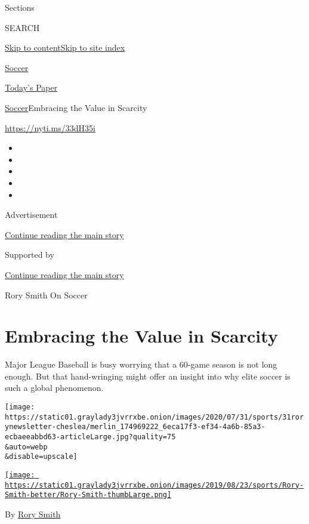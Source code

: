 Sections

SEARCH

\protect\hyperlink{site-content}{Skip to
content}\protect\hyperlink{site-index}{Skip to site index}

\href{https://www.nytimes3xbfgragh.onion/section/sports/soccer}{Soccer}

\href{https://myaccount.nytimes3xbfgragh.onion/auth/login?response_type=cookie\&client_id=vi}{}

\href{https://www.nytimes3xbfgragh.onion/section/todayspaper}{Today's
Paper}

\href{/section/sports/soccer}{Soccer}\textbar{}Embracing the Value in
Scarcity

\url{https://nyti.ms/33dH35i}

\begin{itemize}
\item
\item
\item
\item
\item
\end{itemize}

Advertisement

\protect\hyperlink{after-top}{Continue reading the main story}

Supported by

\protect\hyperlink{after-sponsor}{Continue reading the main story}

Rory Smith On Soccer

\hypertarget{embracing-the-value-in-scarcity}{%
\section{Embracing the Value in
Scarcity}\label{embracing-the-value-in-scarcity}}

Major League Baseball is busy worrying that a 60-game season is not long
enough. But that hand-wringing might offer an insight into why elite
soccer is such a global phenomenon.

\texttt{[image: https://static01.graylady3jvrrxbe.onion/images/2020/07/31/sports/31rorynewsletter-cheslea/merlin\_174969222\_6eca17f3-ef34-4a6b-85a3-ecbaeeabbd63-articleLarge.jpg?quality=75\\\&auto=webp\\\&disable=upscale]}

\href{https://www.nytimes3xbfgragh.onion/by/rory-smith}{\texttt{[image: https://static01.graylady3jvrrxbe.onion/images/2019/08/23/sports/Rory-Smith-better/Rory-Smith-thumbLarge.png]}}

By \href{https://www.nytimes3xbfgragh.onion/by/rory-smith}{Rory Smith}

